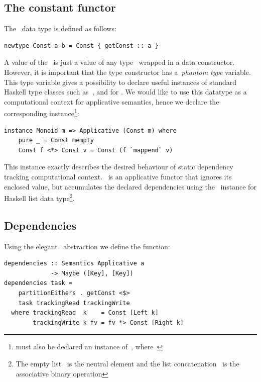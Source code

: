 \subsection{The constant functor}

The~ data type is defined as follows:

\begin{verbatim}
newtype Const a b = Const { getConst :: a }
\end{verbatim}

A value of the~ is just a value of any type~
wrapped in a data constructor. However, it is important that the type constructor
has a~\emph{phantom type} variable. This type variable gives a possibility to
declare useful instances of standard Haskell type classes such as~,
 and  for . We would like to use this
datatype as a computational context for applicative semantics, hence we declare
the corresponding instance\footnote{ must also be declared an instance
of~, where~}:

\begin{verbatim}
instance Monoid m => Applicative (Const m) where
    pure _ = Const mempty
    Const f <*> Const v = Const (f `mappend` v)
\end{verbatim}

This instance exactly describes the desired behaviour of static dependency tracking
computational context.~ is an applicative functor that ignores
its enclosed value, but accumulates the declared dependencies using the~
instance for Haskell list data type\footnote{The empty list~\hs{[]} is the
neutral element and the list concatenation~\hs{(++)} is the associative binary operation}.

\subsection{Dependencies}

Using the elegant~ abstraction we define the  function:

\begin{verbatim}
dependencies :: Semantics Applicative a
             -> Maybe ([Key], [Key])
dependencies task =
    partitionEithers . getConst <$>
    task trackingRead trackingWrite
  where trackingRead  k    = Const [Left k]
        trackingWrite k fv = fv *> Const [Right k]
\end{verbatim}

